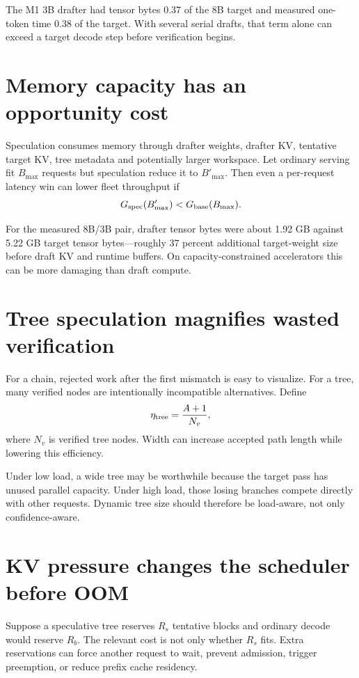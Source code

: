 The M1 3B drafter had tensor bytes 0.37 of the 8B target and measured one-token time
0.38 of the target. With several serial drafts, that term alone can exceed a target
decode step before verification begins.

\section{Memory capacity has an opportunity cost}

Speculation consumes memory through drafter weights, drafter KV, tentative target KV,
tree metadata and potentially larger workspace. Let ordinary serving fit $B_{\max}$
requests but speculation reduce it to $B'_{\max}$. Then even a per-request latency
win can lower fleet throughput if
\[
G_{\rm spec}(B'_{\max}) < G_{\rm base}(B_{\max}).
\]

For the measured 8B/3B pair, drafter tensor bytes were about 1.92 GB against 5.22 GB
target tensor bytes---roughly 37 percent additional target-weight size before draft KV
and runtime buffers. On capacity-constrained accelerators this can be more damaging
than draft compute.

\section{Tree speculation magnifies wasted verification}

For a chain, rejected work after the first mismatch is easy to visualize. For a tree,
many verified nodes are intentionally incompatible alternatives. Define
\[
\eta_{\rm tree}=\frac{A+1}{N_v},
\]
where $N_v$ is verified tree nodes. Width can increase accepted path length while
lowering this efficiency.

Under low load, a wide tree may be worthwhile because the target pass has unused
parallel capacity. Under high load, those losing branches compete directly with other
requests. Dynamic tree size should therefore be load-aware, not only confidence-aware.

\section{KV pressure changes the scheduler before OOM}

Suppose a speculative tree reserves $R_s$ tentative blocks and ordinary decode would
reserve $R_b$. The relevant cost is not only whether $R_s$ fits. Extra reservations can
force another request to wait, prevent admission, trigger preemption, or reduce prefix
cache residency.

